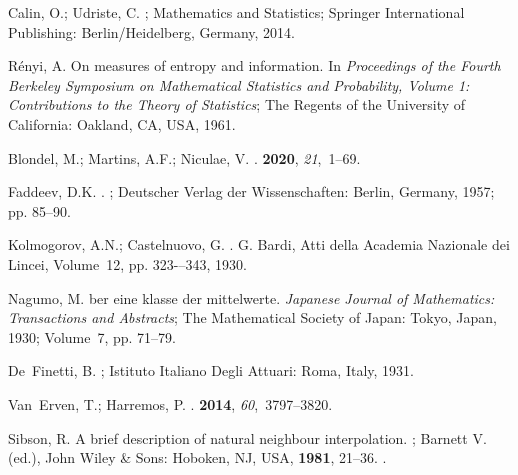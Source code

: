 \documentclass[entropy,article,accept,oneauthor,pdftex,entropy]{Definitions/mdpi}
\begin{document}
\begin{thebibliography}{999}
Calin, O.; Udriste, C.
; Mathematics
  and Statistics;  Springer International Publishing:  {Berlin/Heidelberg, Germany,}  2014.

R{\'e}nyi, A. 
\newblock On measures of entropy and information.
\newblock  In \emph{Proceedings of the Fourth Berkeley Symposium on Mathematical
  Statistics and Probability, Volume 1: Contributions to the Theory of
  Statistics}; The Regents of the University of California: {Oakland, CA, USA},  1961.

Blondel, M.; Martins, A.F.; Niculae, V.
.
 {\bf 2020}, {\em
  21},~1--69.

Faddeev, D.K.
.
; Deutscher Verlag der
  Wissenschaften: {Berlin, Germany}, {1957}; pp. 85--90.

{Kolmogorov, A.N.; Castelnuovo, G.} 
. G. Bardi, Atti della Academia Nazionale dei Lincei,  Volume~12, pp. 323-–343, 1930.

Nagumo, M.
ber eine klasse der mittelwerte.
\newblock  \emph{Japanese Journal of Mathematics: Transactions and Abstracts}; The
  Mathematical Society of Japan: {Tokyo, Japan},  1930; Volume~7, pp. 71--79.

De~Finetti, B.
; Istituto Italiano Degli Attuari:  {Roma, Italy},  1931.

Van~Erven, T.; Harremos, P.
.
 {\bf 2014}, {\em
  60},~3797--3820.

Sibson, R.
\newblock A brief description of natural neighbour interpolation.
; Barnett V. (ed.),
  John Wiley \& Sons:  {Hoboken, NJ, USA,}     {\bf 1981}, 21--36.
.


\end{thebibliography}
\end{document}
